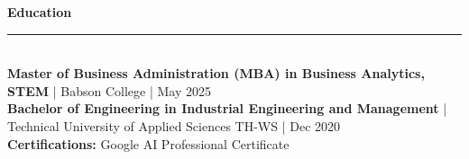 \documentclass[10pt,letterpaper]{article}
\newcommand{\sectiontitle}[1]{%
  \vspace{2pt}
  {\Large \textbf{#1}}\\[-3pt]
  \rule{\linewidth}{0.7pt}\\[1pt]
}
\begin{document}
\sectiontitle{Education}
\textbf{Master of Business Administration (MBA) in Business Analytics, STEM} \;|\; Babson College \;|\; May 2025\\
\textbf{Bachelor of Engineering in Industrial Engineering and Management} \;|\; Technical University of Applied Sciences TH-WS \;|\; Dec 2020\\
\textbf{Certifications:} Google AI Professional Certificate
\end{document}

